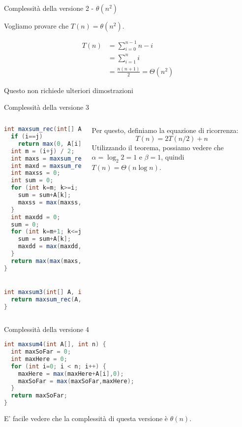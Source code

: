 \begin{frame}{Complessità della versione 2 - $\theta(n^2)$}

Vogliamo provare che $T(n) = \theta(n^2)$.

\begin{align*}
T(n) &= \sum_{i=0}^{n-1} n-i \\
     &= \sum_{i=1}^{n} i \\
     &= \frac{n(n+1)}{2} = \Theta(n^2)
\end{align*}

Questo non richiede ulteriori dimostrazioni

\end{frame}

\begin{frame}[fragile]{Complessità della versione 3}

\footnotesize
\vspace{-6pt}
\begin{columns}[T]
\vspace{-12pt}
\begin{lstlisting}[language=java]
int maxsum_rec(int[] A, int i, int j) {
  if (i==j) 
    return max(0, A[i]);
  int m = (i+j) / 2;
  int maxs = maxsum_rec(A, i, m);
  int maxd = maxsum_rec(A, m+1, j);
  int maxss = 0;
  int sum = 0;
  for (int k=m; k>=i; k--) {
    sum = sum+A[k];
    maxss = max(maxss, sum);
  }
  int maxdd = 0;
  sum = 0;
  for (int k=m+1; k<=j; k++) {
    sum = sum+A[k];
    maxdd = max(maxdd, sum);
  }
  return max(max(maxs,maxd),maxss+maxdd);
}


int maxsum3(int[] A, int n) {
  return maxsum_rec(A,0,n-1);
}
\end{lstlisting}  
Per questo, definiamo la equazione di ricorrenza: \pause
\[
  T(n) = 2T(n/2) + n
\]
Utilizzando il teorema, possiamo vedere che $\alpha = \log_2 2 = 1$ e $\beta=1$, quindi $T(n) = \Theta(n \log n)$.
\end{columns}

\end{frame}


\begin{frame}[fragile]{Complessità della versione 4}

\vspace{-18pt}
\begin{lstlisting}[language=java]
int maxsum4(int A[], int n) {
  int maxSoFar = 0;
  int maxHere = 0;
  for (int i=0; i < n; i++) {
    maxHere = max(maxHere+A[i],0);
    maxSoFar = max(maxSoFar,maxHere);
  }  
  return maxSoFar;
}
\end{lstlisting}  

E' facile vedere che la complessità di questa versione è $\theta(n)$.

\end{frame}



